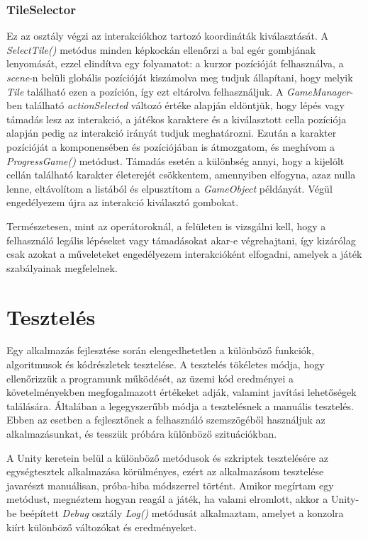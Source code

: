 \documentclass[
]{thesis-ekf}
\theoremstyle{definition}
\theoremstyle{remark}
\begin{document}
\subsection{TileSelector} \label{tileselector}

Ez az osztály végzi az interakciókhoz tartozó koordináták kiválasztását. A \emph{SelectTile()} metódus minden képkockán ellenőrzi a bal egér gombjának lenyomását, ezzel elindítva egy folyamatot: a kurzor pozícióját felhasználva, a \emph{scene}-n belüli globális pozícióját kiszámolva meg tudjuk állapítani, hogy melyik \emph{Tile} található ezen a pozíción, így ezt eltárolva felhasználjuk. A \emph{GameManager}-ben található \emph{actionSelected} változó értéke alapján eldöntjük, hogy lépés vagy támadás lesz az interakció, a játékos karaktere és a kiválasztott cella pozíciója alapján pedig az interakció irányát tudjuk meghatározni. Ezután a karakter pozícióját a komponensében és pozíciójában is átmozgatom, és meghívom a \emph{ProgressGame()} metódust. Támadás esetén a különbség annyi, hogy a kijelölt cellán található karakter életerejét csökkentem, amennyiben elfogyna, azaz nulla lenne, eltávolítom a listából és elpusztítom a \emph{GameObject} példányát. Végül engedélyezem újra az interakció kiválasztó gombokat.

Természetesen, mint az operátoroknál, a felületen is vizsgálni kell, hogy a felhasználó legális lépéseket vagy támadásokat akar-e végrehajtani, így kizárólag csak azokat a műveleteket engedélyezem interakcióként elfogadni, amelyek a játék szabályainak megfelelnek.



\chapter{Tesztelés}

Egy alkalmazás fejlesztése során elengedhetetlen a különböző funkciók, algoritmusok és kódrészletek tesztelése. A tesztelés tökéletes módja, hogy ellenőrizzük a programunk működését, az üzemi kód eredményei a követelményekben megfogalmazott értékeket adják, valamint javítási lehetőségek találására. Általában a legegyszerűbb módja a tesztelésnek a manuális tesztelés. Ebben az esetben a fejlesztőnek a felhasználó szemszögéből használjuk az alkalmazásunkat, és tesszük próbára különböző szituációkban.

A Unity keretein belül a különböző metódusok és szkriptek tesztelésére az egységtesztek alkalmazása körülményes, ezért az alkalmazásom tesztelése javarészt manuálisan, próba-hiba módszerrel történt. Amikor megírtam egy metódust, megnéztem hogyan reagál a játék, ha valami elromlott, akkor a Unity-be beépített \emph{Debug} osztály \emph{Log()} metódusát alkalmaztam, amelyet a konzolra kiírt különböző változókat és eredményeket.
\end{document}
